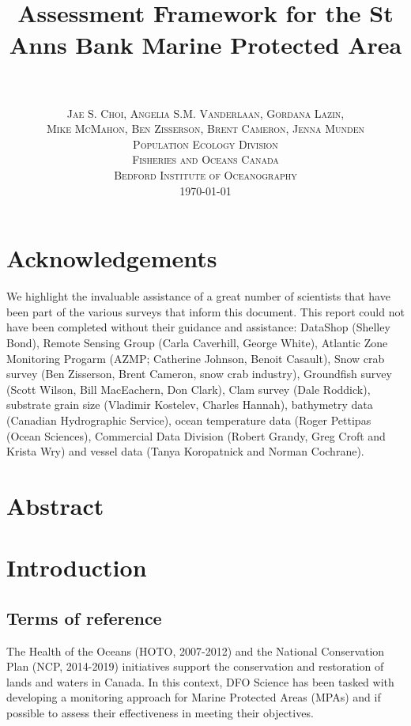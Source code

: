 \documentclass[letterpaper,portrait,11pt]{scrartcl}
\title{
		\usefont{OT1}{bch}{b}{n}
		\horrule{0.5pt} \\[0.4cm]
		\huge Assessment Framework for the St Anns Bank Marine Protected Area  \\
		\horrule{2pt} \\[1.0cm]
}
\author{
		\normalfont \normalsize  \textsc{Jae S. Choi, Angelia S.M. Vanderlaan, Gordana Lazin,} \\
    \normalfont \normalsize  \textsc{Mike McMahon,  Ben Zisserson, Brent Cameron, Jenna Munden} \\ [25pt]		
		\normalfont \normalsize \textsc{Population Ecology Division} \\ 
    \normalfont \normalsize \textsc{Fisheries and Oceans Canada} \\ 
    \normalfont \normalsize \textsc{Bedford Institute of Oceanography} \\ [25pt]
    \normalsize \textsc{\today}
}
\date{}
\numberwithin{equation}{section}		%
\numberwithin{figure}{section}		%
\numberwithin{table}{section}				%
\begin{document}
\maketitle

\setlength{\parskip}{12 pt} %
\setlength{\parindent}{0cm}
\setlength{\floatsep}{2cm}
\setcounter{tocdepth}{2} %
\setcounter{secnumdepth}{3} %
\tableofcontents 

\section*{Acknowledgements}

We highlight the invaluable assistance of a great number of scientists that have been part of the various surveys that inform this document. This report could not have been completed without their guidance and assistance: DataShop (Shelley Bond), Remote Sensing Group (Carla Caverhill, George White), Atlantic Zone Monitoring Progarm (AZMP; Catherine Johnson, Benoit Casault), Snow crab survey (Ben Zisserson, Brent Cameron, snow crab industry), Groundfish survey (Scott Wilson, Bill MacEachern, Don Clark), Clam survey (Dale Roddick), substrate grain size (Vladimir Kostelev, Charles Hannah), bathymetry data (Canadian Hydrographic Service), ocean temperature data (Roger Pettipas (Ocean Sciences), Commercial Data Division (Robert Grandy, Greg Croft and Krista Wry) and vessel data (Tanya Koropatnick and Norman Cochrane).

\section*{Abstract}
\clearpage

\section{Introduction}

\subsection{Terms of reference}
The Health of the Oceans (HOTO, 2007-2012) and the National Conservation Plan (NCP, 2014-2019) initiatives support the conservation and restoration of lands and waters in Canada. In this context, DFO Science has been tasked with developing a monitoring approach for Marine Protected Areas (MPAs) and if possible to assess their effectiveness in meeting their objectives. 
\end{document}
